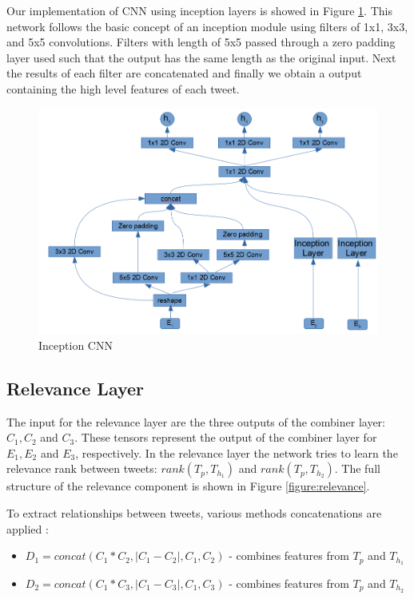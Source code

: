 \documentclass[12pt]{report}
\begin{document}
Our implementation of \ac{CNN} using inception layers is showed in Figure \ref{figure:cnn_combiner}. This network follows the basic concept of an inception module using filters of 1x1, 3x3, and 5x5 convolutions. Filters with length of 5x5 passed through a zero padding layer used such that the output has the same length as the original input. Next the results of each filter are concatenated and finally we obtain a output containing the high level features of each tweet.


\begin{figure}[H]	
	\centering
	\includegraphics[width=140mm, scale = 1]{images/16_cnn_model.png}	
	\caption{Inception \ac{CNN}}	
	\label{figure:cnn_combiner}
\end{figure}

\subsection{Relevance Layer}

The input for the relevance layer are the three outputs of the combiner layer: $C_1, C_2$ and $C_3$. These tensors represent 
the output of the combiner layer for $E_1, E_2$ and $E_3$, respectively.  In the relevance layer the network tries to learn the relevance rank between tweets: 
$rank(T_p, T_{h_1})$ and $rank(T_p, T_{h_2})$.  The full structure of the relevance component is shown in Figure \ref{figure:relevance}.

To extract relationships between tweets, various methods concatenations are applied : 

\begin{itemize}
	\item $D_1 = concat(C_1*C_2, |C_1 - C_2|, C_1, C_2)$  - combines features from $T_p$ and $T_{h_1}$
	\item $D_2 = concat(C_1*C_3, |C_1 - C_3|, C_1, C_3)$  - combines features from $T_p$ and $T_{h_2}$
\end{itemize}
\end{document}
